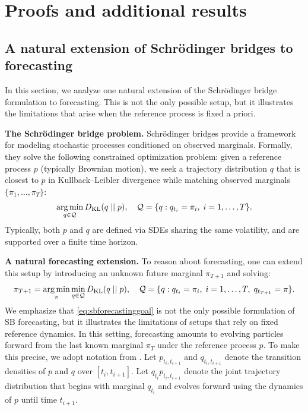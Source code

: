 \section{Proofs and additional results}
\label{app:proofs}

\subsection{A natural extension of Schr\"odinger bridges to forecasting}
\label{app:sb-forecasting}
In this section, we analyze one natural extension of the Schrödinger bridge formulation to forecasting. This is not the only possible setup, but it illustrates the limitations that arise when the reference process is fixed a priori.

\textbf{The Schrödinger bridge problem.} Schr\"odinger bridges provide a framework for modeling stochastic processes conditioned on observed marginals. Formally, they solve the following constrained optimization problem: given a reference process $p$ (typically Brownian motion), we seek a trajectory distribution $q$ that is closest to $p$ in Kullback--Leibler divergence while matching observed marginals $\{\pi_1, \dots, \pi_T\}$:
\begin{equation}
    \operatorname*{arg\,min}_{q \in \mathcal{Q}} D_{\mathrm{KL}}(q \mid\mid p), \quad \mathcal{Q} = \{q : q_{t_i} = \pi_i, \; i = 1, \dots, T\}.
    \label{eq:sb-problem}
\end{equation}
Typically, both $p$ and $q$ are defined via SDEs sharing the same volatility, and are supported over a finite time horizon.

\textbf{A natural forecasting extension.} To reason about forecasting, one can extend this setup by introducing an unknown future marginal $\pi_{T+1}$ and solving:
\begin{equation}
    \pi_{T+1} = \operatorname*{arg\,min}_{\pi} \min_{q \in \mathcal{Q}} D_{\mathrm{KL}}(q \mid\mid p), \quad \mathcal{Q} = \{q : q_{t_i} = \pi_i, \; i = 1, \dots, T, \; q_{t_{T+1}} = \pi\}.
    \label{eq:sbforecastinggoal}
\end{equation}
We emphasize that \eqref{eq:sbforecastinggoal} is not the only possible formulation of SB forecasting, but it illustrates the limitations of setups that rely on fixed reference dynamics. In this setting, forecasting amounts to evolving particles forward from the last known marginal $\pi_T$ under the reference process $p$. To make this precise, we adopt notation from \citet{Lavenant2021}. Let $p_{t_i, t_{i+1}}$ and $q_{t_i, t_{i+1}}$ denote the transition densities of $p$ and $q$ over $[t_i, t_{i+1}]$. Let $q_{t_i} p_{t_i, t_{i+1}}$ denote the joint trajectory distribution that begins with marginal $q_{t_i}$ and evolves forward using the dynamics of $p$ until time $t_{i+1}$.

